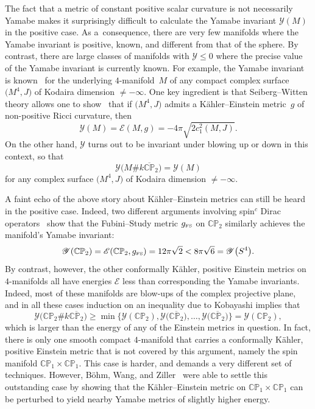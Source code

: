 \documentclass[10pt,a4paper]{amsart}
\numberwithin{equation}{section}
\def\CP{\mathbb{CP}}
\begin{document}
The fact that a metric of constant positive scalar curvature is not necessarily Yamabe makes it surprisingly difficult
to calculate the Yamabe invariant $\mathscr{Y}(M)$ in the positive case. As a~consequence, there are very few manifolds
where the Yamabe invariant is positive, known, and different from that of the sphere. By contrast, there are
large classes of manifolds with $\mathscr{Y}\leq 0$ where the precise value of the Yamabe invariant is currently known.
For example, the Yamabe invariant is known~\cite{albaleb,lky} for the underlying $4$-manifold~$M$ of any compact complex surface $\big(M^4,J\big)$
of Kodaira dimension $\neq -\infty$. One key ingredient is that Seiberg--Witten theory allows one to show~\cite{lno} that
if $\big(M^4,J\big)$ admits a K\"ahler--Einstein metric~$g$ of non-positive Ricci curvature, then
\begin{equation*}
\mathscr{Y} (M) = \mathscr{E}(M, g)=
-4\pi\sqrt{2 c_1^2 (M,J)}.
\end{equation*}
On the other hand, $\mathscr{Y}$ turns out to be invariant under blowing up or down in this context, so that \cite{albaleb,lno,lky}
\begin{equation*}
\mathscr{Y} \big(M\# k \overline{\CP}_2\big) =\mathscr{Y} (M)
\end{equation*}
for any complex surface $\big(M^4,J\big)$ of Kodaira dimension $\neq -\infty$.

A faint echo of the
 above story about K\"ahler--Einstein metrics can still be heard in the positive case. Indeed, two different arguments involving
 spin$^c$ Dirac operators~\cite{gl1,lcp2} show that the Fubini--Study metric $g_{\text{\tiny FS}}$ on $\CP_2$ similarly
achieves the manifold's Yamabe invariant:
\begin{equation*}
\mathscr{Y} (\CP_2) = \mathscr{E}(\CP_2, g_{\text{\tiny FS}})= 12\pi \sqrt{2} < 8 \pi \sqrt{6} = \mathscr{Y} \big(S^4\big).
\end{equation*}
By contrast, however, the other conformally K\"ahler, positive
Einstein metrics on $4$-manifolds \cite{chenlebweb,lebuniq,sunspot,page,ty} all have energies $\mathscr{E}$ less than corresponding the Yamabe invariants.
 Indeed, most of these manifolds are blow-ups of the complex projective plane, and in all these cases induction on an inequality due to Kobayashi \cite[Theorem 2]{okob} implies that
 \begin{equation*}
\mathscr{Y} \big(\CP_2\# k \overline{\CP_2}\big) \geq \min \big\{ \mathscr{Y} (\CP_2), \mathscr{Y} \big( \overline{\CP_2}\big), \ldots , \mathscr{Y} \big( \overline{\CP_2}\big)\big\} = \mathscr{Y} (\CP_2),
\end{equation*}
which is larger than the energy of any of the Einstein metrics in question.
In fact, there is only one smooth compact $4$-manifold that carries a conformally K\"ahler, positive Einstein metric that is not covered by this argument, namely the
spin manifold $\CP_1 \times \CP_1$. This case is harder, and demands a very different set of techniques. However,
 B\"ohm, Wang, and Ziller~\cite{bwz} were able to settle this outstanding case by showing that the K\"ahler--Einstein metric on $\CP_1 \times \CP_1$ can be perturbed to yield
nearby Yamabe metrics of slightly higher energy.
\end{document}
